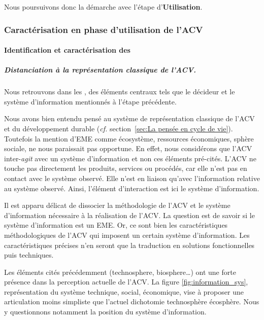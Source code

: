 Nous poursuivons donc la démarche avec l'étape d'\textbf{Utilisation}.

\subsubsection{Caractérisation en phase d'utilisation de l'\acrshort{ACV}}
\label{subsubsec:Caractérisation ACV}

\paragraph{Identification et caractérisation des }

\subparagraph{Distanciation à la représentation classique de l'\gls{ACV}.}
\label{par:Distanciation à la représentation classique de l'ACV}
Nous retrouvons dans les , des éléments centraux tels que le décideur et le système d'information mentionnés à l'étape précédente.

Nous avons bien entendu pensé au système de représentation classique de l'\gls{ACV} et du développement durable (\textit{cf.} section~\ref{sec:La pensée en cycle de vie}).
Toutefois la mention d'\gls{EME} comme écosystème, ressources économiques, sphère sociale, ne nous paraissait pas opportune.
En effet, nous considérons que l'\gls{ACV} inter-\emph{agit} avec un système d'information et non ces éléments pré-cités.
L'\gls{ACV} ne touche pas directement les produits, services ou procédés,
car elle n'est pas en contact avec le système observé.
Elle n'est en liaison qu'avec l'information relative au système observé.
Ainsi, l'élément d'interaction est ici le système d'information.

Il est apparu délicat de dissocier la méthodologie de l'\gls{ACV} et le système d'information nécessaire à la réalisation de l'\gls{ACV}.
La question est de savoir si le système d'information est un \gls{EME}.
Or, ce sont bien les caractéristiques méthodologiques de l'\gls{ACV} qui imposent un certain système d'information.
Les caractéristiques précises n'en seront que la traduction en solutions fonctionnelles puis techniques.

Les éléments cités précédemment (\gls{technosphere}, \gls{biosphere}\ldots) ont une forte présence dans la perception actuelle de l'\gls{ACV}.
La figure \ref{fig:information_sys},
représentation du système technique, social, économique, vise à proposer une articulation moins simpliste que l'actuel dichotomie technosphère écosphère.
Nous y questionnons notamment la position du système d'information. %


